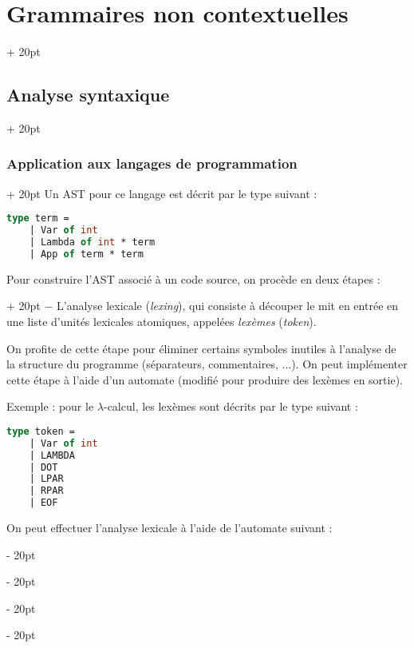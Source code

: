 \documentclass[a4paper, 12pt, twoside]{article}
\newcommand{\ind}[1][20pt]{\advance\leftskip + #1}
\newcommand{\deind}[1][20pt]{\advance\leftskip - #1}
\newenvironment{indt}[2][20pt]{#2 \par \ind[#1]}{\par \deind} %
\begin{document}
\begin{indt}{\section{Grammaires non contextuelles}}
\begin{indt}{\subsection{Analyse syntaxique}}
\begin{indt}{\subsubsection{Application aux langages de programmation}}
                Un AST pour ce langage est décrit par le type suivant :
                \begin{lstlisting}[language=Caml, xleftmargin=80pt]
type term =
    | Var of int
    | Lambda of int * term
    | App of term * term\end{lstlisting}

                \vspace{6pt}
                
                \begin{indt}{Pour construire l'AST associé à un code source, on procède en deux étapes :}
                    $-$ L'analyse lexicale (\textit{lexing}), qui consiste à découper le mit en entrée en une liste d'unités lexicales atomiques, appelées \emph{lexèmes} (\textit{token}).

                    On profite de cette étape pour éliminer certains symboles inutiles à l'analyse de la structure du programme (séparateurs, commentaires, ...).
                    On peut implémenter cette étape à l'aide d'un automate (modifié pour produire des lexèmes en sortie).

                    \vspace{6pt}
                    
                    Exemple : pour le $\lambda$-calcul, les lexèmes sont décrits par le type suivant :
                    \begin{lstlisting}[language=Caml, xleftmargin=100pt]
type token =
    | Var of int
    | LAMBDA
    | DOT
    | LPAR
    | RPAR
    | EOF\end{lstlisting}

                    On peut effectuer l'analyse lexicale à l'aide de l'automate suivant :



\end{indt}
\end{indt}
\end{indt}
\end{indt}
\end{document}
